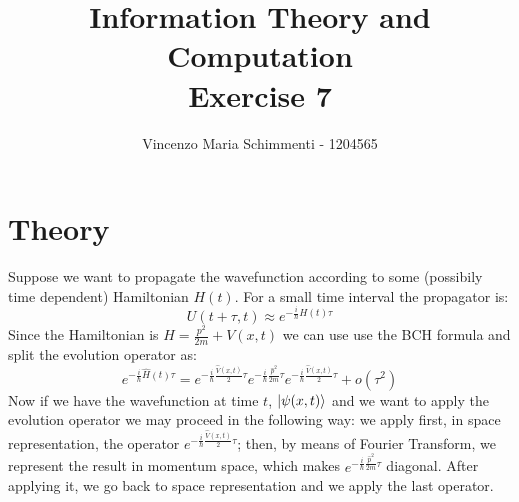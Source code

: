 \documentclass{article}
\title{%
	Information Theory and Computation \\
	Exercise  7}
\author{Vincenzo Maria Schimmenti - 1204565}
\begin{document}
\maketitle
 
\section*{Theory}
Suppose we want to propagate the wavefunction according to some (possibily time dependent) Hamiltonian $H(t)$. For a small time interval the propagator is:
\begin{equation}
	U(t+\tau,t) \approx e^{-\frac{i}{\hbar}H(t) \tau}
\end{equation}
Since the Hamiltonian is $H=\frac{p^2}{2m}+V(x,t)$ we can use use the BCH formula and split the evolution operator as:
\begin{equation}
	e^{-\frac{i}{\hbar}\hat{H}(t) \tau} = e^{-\frac{i}{\hbar}\frac{\hat{V}(x,t)}{2} \tau} e^{-\frac{i}{\hbar} \frac{\hat{p}^2}{2m} \tau}  e^{-\frac{i}{\hbar}\frac{\hat{V}(x,t)}{2} \tau} +o(\tau^2)
\end{equation}
Now if we have the wavefunction at time $t$, $\ket{\psi(x,t)}$ and we want to apply the evolution operator we may proceed in the following way: we apply first, in space representation, the operator $e^{-\frac{i}{\hbar}\frac{\hat{V}(x,t)}{2} \tau}$; then, by means of Fourier Transform, we represent the result in momentum space, which makes $e^{-\frac{i}{\hbar} \frac{\hat{p}^2}{2m} \tau}$ diagonal. After applying it, we go back to space representation and we apply the last operator. 
\end{document}
